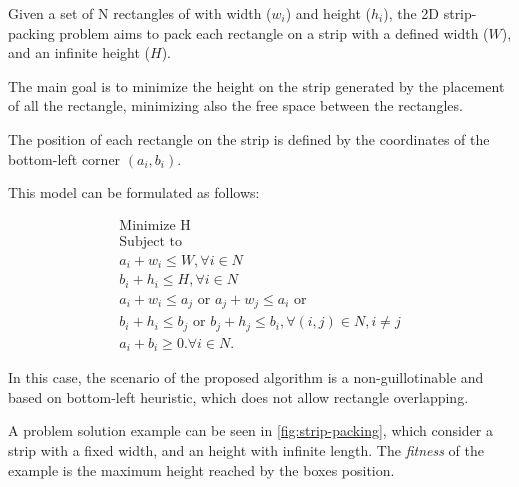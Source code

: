 Given a set of N rectangles of with width ($w_{i}$) and height ($h_{i}$),
the 2D strip-packing problem aims to pack each rectangle on a strip
with a defined width ($W$), and an infinite height ($H$).

The main goal is to minimize the height on the strip
generated by the placement of all the rectangle,
minimizing also the free space between the rectangles.

The position of each rectangle on the strip is defined
by the coordinates of the bottom-left corner $(a_{i},b_{i})$.

This model can be formulated as follows:

\begin{eqnarray}
\text{Minimize H}\nonumber \\
\text{Subject to}\nonumber \\
a_{i} + w_{i} \leq W, \forall i \in N \\
b_{i} + h_{i} \leq H, \forall i \in N \\
a_{i} + w_{i} \leq a_{j}\text{ or }a_{j} + w_{j} \leq a_{i}\text{ or }\nonumber\\
b_{i} + h_{i} \leq b_{j}\text{ or }b_{j} + h_{j} \leq b_{i}, \forall (i,j) \in N, i\neq j\\
a_{i} + b_{i} \geq 0. \forall i \in N.
\end{eqnarray}

In this case,
the scenario of the proposed algorithm is a non-guillotinable
and based on bottom-left heuristic, which does not allow rectangle overlapping.

A problem solution example can be seen in \ref{fig:strip-packing},
which consider a strip with a fixed width, and an height with infinite length.
The \emph{fitness} of the example is the maximum height reached
by the boxes position.

